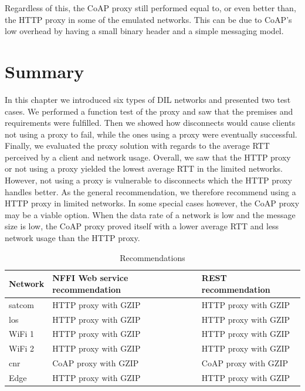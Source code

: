 Regardless of this, the CoAP proxy still performed equal to, or even better
than, the HTTP proxy in some of the emulated networks. This can be due to CoAP's
low overhead by having a small binary header and a simple messaging model.


\section{Summary}

In this chapter we introduced six types of DIL networks and presented two test
cases. We performed a function test of the proxy and saw that the premises and
requirements were fulfilled. Then we showed how disconnects would cause clients
not using a proxy to fail, while the ones using a proxy were eventually
successful. Finally, we evaluated the proxy solution with regards to the average
RTT perceived by a client and network usage. Overall, we saw that the HTTP proxy
or not using a proxy yielded the lowest average RTT in the limited networks.
However, not using a proxy is vulnerable to disconnects which the HTTP proxy
handles better. As the general recommendation, we therefore recommend using a
HTTP proxy in limited networks. In some special cases however, the CoAP proxy
may be a viable option. When the data rate of a network is low and the message
size is low, the CoAP proxy proved itself with a lower average RTT and less
network usage than the HTTP proxy.

\begin{table}[h]
\begin{tabular}{| l | l | l |}
\hline
  \textbf{Network} & \textbf{NFFI Web service recommendation} & \textbf{REST recommendation}\\ \hline
  \gls{satcom} & HTTP proxy with GZIP & HTTP proxy with GZIP \\ \hline
  \gls{los} & HTTP proxy with GZIP  & HTTP proxy with GZIP \\ \hline
  WiFi 1 & HTTP proxy with GZIP & HTTP proxy with GZIP \\ \hline
  WiFi 2 & HTTP proxy with GZIP & HTTP proxy with GZIP \\ \hline
  \gls{cnr} & CoAP proxy with GZIP & CoAP proxy with GZIP \\ \hline
  Edge & HTTP proxy with GZIP & HTTP proxy with GZIP \\ \hline
\end{tabular}
\caption{Recommendations}
\label{table-evaluation-summary}
\end{table}
